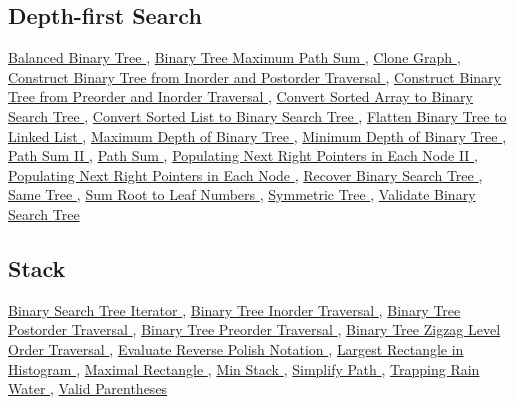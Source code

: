 \documentclass{article}
\begin{document}
\begin{CJK*}{UTF8}{gkai}
\subsection*{ Depth-first Search }
\label{ Depth-first Search }
\hyperref[ Balanced Binary Tree ]{ Balanced Binary Tree },
\hyperref[ Binary Tree Maximum Path Sum ]{ Binary Tree Maximum Path Sum },
\hyperref[ Clone Graph ]{ Clone Graph },
\hyperref[ Construct Binary Tree from Inorder and Postorder Traversal ]{ Construct Binary Tree from Inorder and Postorder Traversal },
\hyperref[ Construct Binary Tree from Preorder and Inorder Traversal ]{ Construct Binary Tree from Preorder and Inorder Traversal },
\hyperref[ Convert Sorted Array to Binary Search Tree ]{ Convert Sorted Array to Binary Search Tree },
\hyperref[ Convert Sorted List to Binary Search Tree ]{ Convert Sorted List to Binary Search Tree },
\hyperref[ Flatten Binary Tree to Linked List ]{ Flatten Binary Tree to Linked List },
\hyperref[ Maximum Depth of Binary Tree ]{ Maximum Depth of Binary Tree },
\hyperref[ Minimum Depth of Binary Tree ]{ Minimum Depth of Binary Tree },
\hyperref[ Path Sum II ]{ Path Sum II },
\hyperref[ Path Sum ]{ Path Sum },
\hyperref[ Populating Next Right Pointers in Each Node II ]{ Populating Next Right Pointers in Each Node II },
\hyperref[ Populating Next Right Pointers in Each Node ]{ Populating Next Right Pointers in Each Node },
\hyperref[ Recover Binary Search Tree ]{ Recover Binary Search Tree },
\hyperref[ Same Tree ]{ Same Tree },
\hyperref[ Sum Root to Leaf Numbers ]{ Sum Root to Leaf Numbers },
\hyperref[ Symmetric Tree ]{ Symmetric Tree },
\hyperref[ Validate Binary Search Tree ]{ Validate Binary Search Tree }

\subsection*{ Stack }
\label{ Stack }
\hyperref[ Binary Search Tree Iterator ]{ Binary Search Tree Iterator },
\hyperref[ Binary Tree Inorder Traversal ]{ Binary Tree Inorder Traversal },
\hyperref[ Binary Tree Postorder Traversal ]{ Binary Tree Postorder Traversal },
\hyperref[ Binary Tree Preorder Traversal ]{ Binary Tree Preorder Traversal },
\hyperref[ Binary Tree Zigzag Level Order Traversal ]{ Binary Tree Zigzag Level Order Traversal },
\hyperref[ Evaluate Reverse Polish Notation ]{ Evaluate Reverse Polish Notation },
\hyperref[ Largest Rectangle in Histogram ]{ Largest Rectangle in Histogram },
\hyperref[ Maximal Rectangle ]{ Maximal Rectangle },
\hyperref[ Min Stack ]{ Min Stack },
\hyperref[ Simplify Path ]{ Simplify Path },
\hyperref[ Trapping Rain Water ]{ Trapping Rain Water },
\hyperref[ Valid Parentheses ]{ Valid Parentheses }


\end{CJK*}
\end{document}
